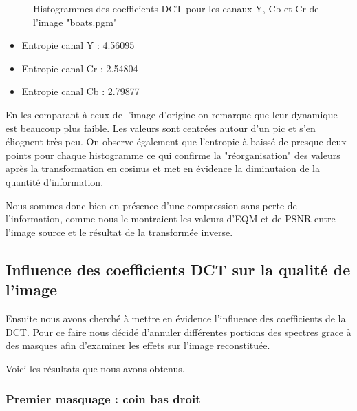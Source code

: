 \documentclass[12pt]{report}
\begin{document}
\begin{figure}[H]
\begin{center}
\caption{Histogrammes des coefficients DCT pour les canaux Y, Cb et Cr de l'image "boats.pgm"}
\end{center}
\end{figure}

\begin{itemize}
\item Entropie canal Y : 4.56095
\item Entropie canal Cr : 2.54804
\item Entropie canal Cb : 2.79877\\
\end{itemize}

En les comparant à ceux de l'image d'origine on remarque que leur dynamique est beaucoup plus faible. Les valeurs sont centrées autour d'un pic et s'en éliognent très peu. On observe également que l'entropie à baissé de presque deux points pour chaque histogramme ce qui confirme la "réorganisation" des valeurs après la transformation en cosinus et met en évidence la diminutaion de la quantité d'information.

Nous sommes donc bien en présence d'une compression sans perte de l'information, comme nous le montraient les valeurs d'EQM et de PSNR entre l'image source et le résultat de la transformée inverse.

\subsection{Influence des coefficients DCT sur la qualité de l'image}

Ensuite nous avons cherché à mettre en évidence l'influence des coefficients de la DCT. Pour ce faire nous décidé d'annuler différentes portions des spectres grace à des masques afin d'examiner les effets sur l'image reconstituée.

Voici les résultats que nous avons obtenus.

\subsubsection{Premier masquage : coin bas droit}
\end{document}
